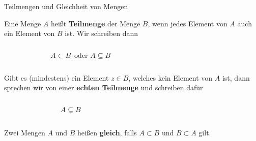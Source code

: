 \documentclass[12pt,ngerman,a4paper,ignorenonframetext,]{beamer}
\begin{document}
\begin{frame}{Teilmengen und Gleichheit von Mengen}
\protect\hypertarget{teilmengen-und-gleichheit-von-mengen}{}


\begin{definition}[Teilmenge]

Eine Menge \(A\) heißt \textbf{Teilmenge} der Menge \(B\), wenn jedes
Element von \(A\) auch ein Element von \(B\) ist. Wir schreiben dann

\begin{columns}[T]
\begin{column}{0.49\textwidth}
\[ A \subset B \, \text{ oder } A \subseteq B\]
\end{column}

\begin{column}{0.49\textwidth}
\end{column}
\end{columns}

Gibt es (mindestens) ein Element \(z \in B\), welches kein Element von
\(A\) ist, dann sprechen wir von einer \textbf{echten Teilmenge} und
schreiben dafür

\begin{columns}[T]
\begin{column}{0.49\textwidth}
\[ A \subsetneq B \]
\end{column}

\begin{column}{0.49\textwidth}
\end{column}
\end{columns}

\end{definition}


\begin{definition}[Gleichheit]

Zwei Mengen \(A\) und \(B\) heißen \textbf{gleich}, falls
\(A \subset B\) und \(B \subset A\) gilt.

\end{definition}

\end{frame}
\end{document}
